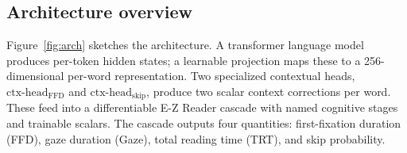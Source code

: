 \documentclass[11pt]{article}
\begin{document}
\subsection{Architecture overview}\label{sec:arch}

Figure~\ref{fig:arch} sketches the architecture. A transformer language model produces per-token hidden states; a learnable projection maps these to a 256-dimensional per-word representation. Two specialized contextual heads, $\mathrm{ctx\text{-}head}_{\text{FFD}}$ and $\mathrm{ctx\text{-}head}_{\text{skip}}$, produce two scalar context corrections per word. These feed into a differentiable E-Z Reader cascade with named cognitive stages and trainable scalars. The cascade outputs four quantities: first-fixation duration (FFD), gaze duration (Gaze), total reading time (TRT), and skip probability.
\end{document}
